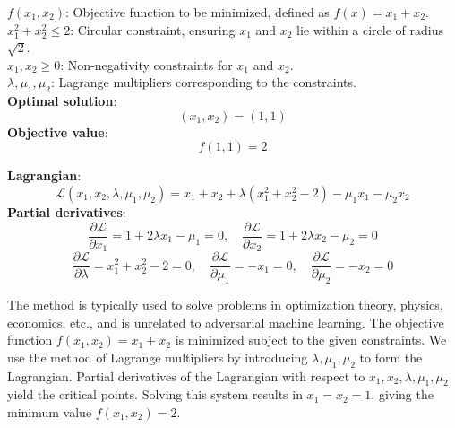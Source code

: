 
\textbf{$f(x_1, x_2)$}: Objective function to be minimized, defined as $f(x) = x_1 + x_2$. \\
\textbf{$x_1^2 + x_2^2 \leq 2$}: Circular constraint, ensuring $x_1$ and $x_2$ lie within a circle of radius $\sqrt{2}$. \\
\textbf{$x_1, x_2 \geq 0$}: Non-negativity constraints for $x_1$ and $x_2$. \\
\textbf{$\lambda, \mu_1, \mu_2$}: Lagrange multipliers corresponding to the constraints. \\

\textbf{Optimal solution}: 
\[
(x_1, x_2) = (1, 1)
\]
\textbf{Objective value}:
\[
f(1, 1) = 2
\]

\textbf{Lagrangian}:
\[
\mathcal{L}(x_1, x_2, \lambda, \mu_1, \mu_2) = x_1 + x_2 + \lambda (x_1^2 + x_2^2 - 2) - \mu_1 x_1 - \mu_2 x_2
\]
\textbf{Partial derivatives}:
\[
\frac{\partial \mathcal{L}}{\partial x_1} = 1 + 2\lambda x_1 - \mu_1 = 0, \quad
\frac{\partial \mathcal{L}}{\partial x_2} = 1 + 2\lambda x_2 - \mu_2 = 0
\]
\[
\frac{\partial \mathcal{L}}{\partial \lambda} = x_1^2 + x_2^2 - 2 = 0, \quad
\frac{\partial \mathcal{L}}{\partial \mu_1} = -x_1 = 0, \quad
\frac{\partial \mathcal{L}}{\partial \mu_2} = -x_2 = 0
\]

The method is typically used to solve problems in optimization theory, physics, economics, etc., and is unrelated to adversarial machine learning. The objective function $f(x_1, x_2) = x_1 + x_2$ is minimized subject to the given constraints. We use the method of Lagrange multipliers by introducing $\lambda, \mu_1, \mu_2$ to form the Lagrangian. Partial derivatives of the Lagrangian with respect to $x_1, x_2, \lambda, \mu_1, \mu_2$ yield the critical points. Solving this system results in $x_1 = x_2 = 1$, giving the minimum value $f(x_1, x_2) = 2$.